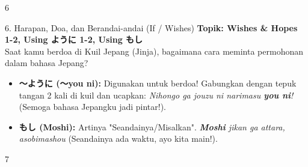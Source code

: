 \begin{convobox}{6}
    \noindent

    \vspace{1.5em}
\end{convobox}

\begin{lessonbox}{6. Harapan, Doa, dan Berandai-andai (If / Wishes)}
    \textbf{Topik: Wishes \& Hopes 1-2, Using ように 1-2, Using もし} \\
    Saat kamu berdoa di Kuil Jepang (Jinja), bagaimana cara meminta permohonan dalam bahasa Jepang?
    \begin{itemize}
        \item \textbf{〜ように (〜you ni):} Digunakan untuk berdoa! Gabungkan dengan tepuk tangan 2 kali di kuil dan ucapkan: \textit{Nihongo ga jouzu ni narimasu \textbf{you ni}!} (Semoga bahasa Jepangku jadi pintar!).
        \item \textbf{もし (Moshi):} Artinya "Seandainya/Misalkan". \textit{\textbf{Moshi} jikan ga attara, asobimashou} (Seandainya ada waktu, ayo kita main!).
    \end{itemize}
\end{lessonbox}

\begin{convobox}{7}
    \noindent

    \vspace{1.5em}
\end{convobox}


